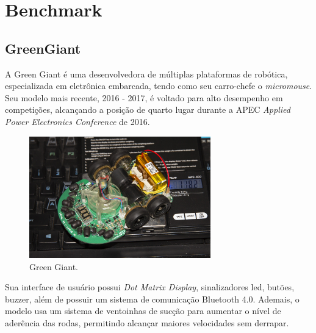 \section{Benchmark}
\label{sec:benchmark}

\subsection{GreenGiant}
\hspace{0.5cm} A Green Giant é uma desenvolvedora de múltiplas plataformas de robótica, especializada em eletrônica embarcada, tendo como seu carro-chefe o \textit{micromouse}. Seu modelo mais recente, 2016 - 2017, é voltado para alto desempenho em competições, alcançando a posição de quarto lugar durante a APEC \textit{Applied Power Electronics Conference} de 2016.

\begin{figure}[H]
	\centering
	\includegraphics[width=0.7\textwidth]
	{Figures/GreenGiant_model.jpg}
	\caption{\label{fig:Green_Giant_model} Green Giant. }
	\end{figure}

\hspace{0.5cm}Sua interface de usuário possui \textit{Dot Matrix Display}, sinalizadores led, butões, buzzer, além de possuir um sistema de comunicação Bluetooth 4.0. Ademais, o modelo usa um sistema de ventoinhas de sucção para aumentar o nível de aderência das rodas, permitindo alcançar maiores velocidades sem derrapar.

